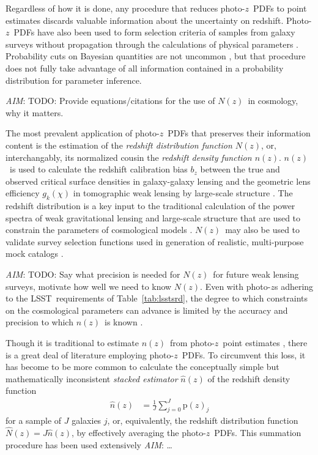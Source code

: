 \documentclass[iop]{emulateapj}
\newcommand{\todo}[3]{{\color{#2}\emph{#1}: #3}}
\newcommand{\aim}[1]{\todo{AIM}{red}{#1}}
\newcommand{\Tab}[1]{Table~\ref{#1}}
\newcommand{\project}[1]{\textsc{#1}}
\newcommand{\lsst}{\project{LSST}}
\newcommand{\pr}[1]{\ensuremath{\mathrm{p}(#1)}}%
\newcommand{\pz}{photo-$z$}
\newcommand{\Pz}{Photo-$z$}
\newcommand{\pzpdf}{\pz\ PDF}%
\newcommand{\Pzpdf}{\Pz\ PDF}%
\newcommand{\nz}{$n(z)$}
\newcommand{\Nz}{$N(z)$}
\begin{document}
Regardless of how it is done, any procedure that reduces \pzpdf s to point estimates discards valuable information about the uncertainty on redshift.
\Pzpdf s have also been used to form selection criteria of samples from galaxy surveys without propagation through the calculations of physical parameters \citep{van_breukelen_reliable_2009, viironen_high_2015}.  
Probability cuts on Bayesian quantities are not uncommon \citep{leung_bayesian_2017, dipompeo_quasar_2015}, but that procedure does not fully take advantage of all information contained in a probability distribution for parameter inference.

\aim{TODO: Provide equations/citations for the use of \Nz\ in cosmology, why it matters.}

The most prevalent application of \pzpdf s that preserves their information content is the estimation of the \textit{redshift distribution function \Nz}, or, interchangably, its normalized cousin the \textit{redshift density function \nz}.
\nz\ is used to calculate the redshift calibration bias $b_{z}$ between the true and observed critical surface densities in galaxy-galaxy lensing \citep{mandelbaum_precision_2008} and the geometric lens efficiency $g_{k}(\chi)$ in tomographic weak lensing by large-scale structure \citep{benjamin_cfhtlens_2013}.
The redshift distribution is a key input to the traditional calculation of the power spectra of weak gravitational lensing and large-scale structure that are used to constrain the parameters of cosmological models \citep{bonnett_using_2015,  masters_mapping_2015, viironen_high_2015, asorey_galaxy_2016, bonnett_redshift_2016, yang_calibrating_2018}.
\Nz\ may also be used to validate survey selection functions used in generation of realistic, multi-purpose mock catalogs \citep{norberg_2df_2002}.

\aim{TODO: Say what precision is needed for \Nz\ for future weak lensing surveys, motivate how well we need to know \Nz.}
Even with \pz s adhering to the \lsst\ requirements of \Tab{tab:lsstsrd}, the degree to which constraints on the cosmological parameters can advance is limited by the accuracy and precision to which \nz\ is known \citep{abruzzo_impact_2019}.

Though it is traditional to estimate \nz\ from \pz\ point estimates \citep{abruzzo_impact_2019}, there is a great deal of literature employing \pzpdf s.
To circumvent this loss, it has become to be more common to calculate the conceptually simple but mathematically inconsistent \citep{hogg_data_2012} \textit{stacked estimator} $\hat{n}(z)$ of the redshift density function \citep{lima_estimating_2008}
\begin{align}
\label{eqn:stack}
\hat{n}(z) &= \frac{1}{J} \sum_{j = 0}^{J} \pr{z}_{j}
\end{align}
for a sample of $J$ galaxies $j$, or, equivalently, the redshift distribution function $\hat{N}(z) = J \hat{n}(z)$, by effectively averaging the \pzpdf s.
This summation procedure has been used extensively \citep{mandelbaum_precision_2008, benjamin_cfhtlens_2013, kelly_weighing_2014}\aim{\dots}
\end{document}
